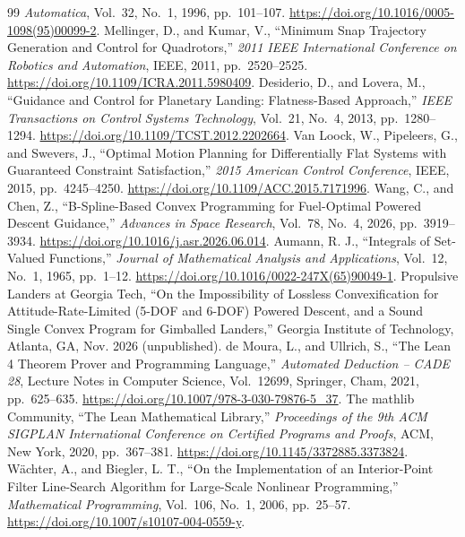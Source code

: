 \documentclass[10pt,letterpaper]{article}
\theoremstyle{aiaa}
\begin{document}
\begin{thebibliography}{99}
\emph{Automatica}, Vol.~32, No.~1, 1996, pp.~101--107. \url{https://doi.org/10.1016/0005-1098(95)00099-2}.
 Mellinger, D., and Kumar, V., ``Minimum Snap Trajectory Generation and Control for Quadrotors,''
\emph{2011 IEEE International Conference on Robotics and Automation}, IEEE, 2011, pp.~2520--2525. \url{https://doi.org/10.1109/ICRA.2011.5980409}.
 Desiderio, D., and Lovera, M., ``Guidance and Control for Planetary Landing: Flatness-Based Approach,''
\emph{IEEE Transactions on Control Systems Technology}, Vol.~21, No.~4, 2013, pp.~1280--1294. \url{https://doi.org/10.1109/TCST.2012.2202664}.
 Van Loock, W., Pipeleers, G., and Swevers, J., ``Optimal Motion Planning for Differentially Flat Systems with
Guaranteed Constraint Satisfaction,'' \emph{2015 American Control Conference}, IEEE, 2015, pp.~4245--4250. \url{https://doi.org/10.1109/ACC.2015.7171996}.
 Wang, C., and Chen, Z., ``B-Spline-Based Convex Programming for Fuel-Optimal Powered Descent Guidance,''
\emph{Advances in Space Research}, Vol.~78, No.~4, 2026, pp.~3919--3934. \url{https://doi.org/10.1016/j.asr.2026.06.014}.
 Aumann, R. J., ``Integrals of Set-Valued Functions,'' \emph{Journal of Mathematical Analysis and Applications},
Vol.~12, No.~1, 1965, pp.~1--12. \url{https://doi.org/10.1016/0022-247X(65)90049-1}.
 Propulsive Landers at Georgia Tech, ``On the Impossibility of Lossless Convexification for Attitude-Rate-Limited
(5-DOF and 6-DOF) Powered Descent, and a Sound Single Convex Program for Gimballed Landers,'' Georgia Institute of Technology,
Atlanta, GA, Nov. 2026 (unpublished).
 de Moura, L., and Ullrich, S., ``The Lean 4 Theorem Prover and Programming Language,'' \emph{Automated Deduction --
CADE 28}, Lecture Notes in Computer Science, Vol.~12699, Springer, Cham, 2021, pp.~625--635. \url{https://doi.org/10.1007/978-3-030-79876-5_37}.
 The mathlib Community, ``The Lean Mathematical Library,'' \emph{Proceedings of the 9th ACM SIGPLAN International
Conference on Certified Programs and Proofs}, ACM, New York, 2020, pp.~367--381. \url{https://doi.org/10.1145/3372885.3373824}.
 W\"achter, A., and Biegler, L. T., ``On the Implementation of an Interior-Point Filter Line-Search Algorithm for
Large-Scale Nonlinear Programming,'' \emph{Mathematical Programming}, Vol.~106, No.~1, 2006, pp.~25--57. \url{https://doi.org/10.1007/s10107-004-0559-y}.
\end{thebibliography}
\end{document}
